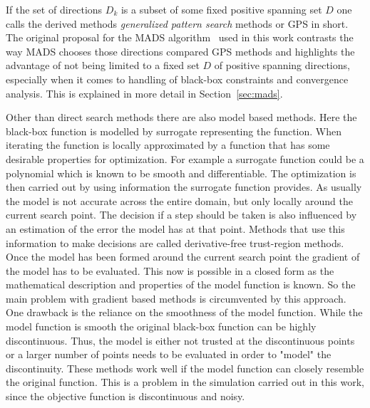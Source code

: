 \documentclass[a4paper,10pt]{article}
\newcommand{\secref}[1]{Section~\ref{#1}}
\begin{document}
    If the set of directions $D_k$ is a subset of some fixed
    positive spanning set $D$ one calls the derived methods
    \emph{generalized pattern search} methods or GPS in short.
    The original proposal for the MADS algorithm~\cite{mads_original}
    used in this work contrasts the way MADS chooses those directions
    compared GPS methods and highlights the advantage of not being
    limited to a fixed set $D$ of positive spanning directions,
    especially when it comes to handling of black-box constraints
    and convergence analysis.
    This is explained in more detail in \secref{sec:mads}.

    Other than direct search methods there are also model based
    methods.
    Here the black-box function is modelled by surrogate representing
    the function.
    When iterating the function is locally approximated by a function
    that has some desirable properties for optimization.
    For example a surrogate function could be a polynomial
    which is known to be smooth and differentiable.
    The optimization is then carried out by using information
    the surrogate function provides.
    As usually the model is not accurate across the entire domain,
    but only locally around the current search point.
    The decision if a step should be taken is also influenced
    by an estimation of the error the model has at that point.
    Methods that use this information to make decisions are called
    derivative-free trust-region methods.
    Once the model has been formed around the current search point
    the gradient of the model has to be evaluated.
    This now is possible in a closed form as the mathematical description
    and properties of the model function is known.
    So the main problem with gradient based methods is circumvented
    by this approach.
    One drawback is the reliance on the smoothness of the model function.
    While the model function is smooth the original black-box
    function can be highly discontinuous.
    Thus, the model is either not trusted at the discontinuous points
    or a larger number of points needs to be evaluated in order to
    "model" the discontinuity.
    These methods work well if the model function can closely resemble
    the original function.
    This is a problem in the simulation carried out in this work, since
    the objective function is discontinuous and noisy.
    
\end{document}
